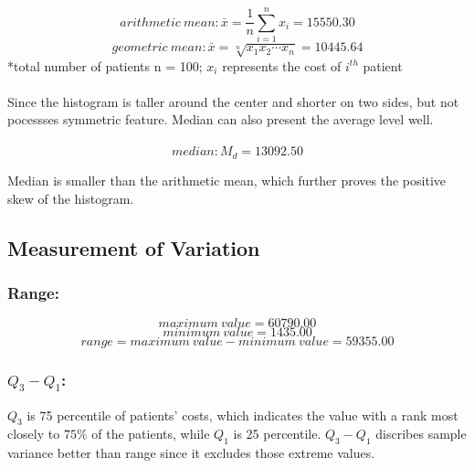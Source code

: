 \documentclass[11pt,a4paper,onside,UTF8]{article}
\begin{document}
\begin{equation}
	arithmetic \ mean: \bar{x} = \frac{1}{n}\sum_{i = 1}^{n} x_i = 15550.30
\end{equation}
\begin{equation}
	geometric \ mean: \bar{x}= \sqrt[n]{x_1 x_2 \cdots x_n} = 10445.64
\end{equation}
\small{*total number of patients n = 100; $x_i$ represents the cost of $i^{th}$ patient}
\\ \hspace*{\fill} \\

Since the histogram is taller around the center and shorter on two sides, but not pocessses symmetric feature. 
Median can also present the average level well. 
\\ \hspace*{\fill} \\

\begin{equation}
	median: M_d = 13092.50
\end{equation}

Median is smaller than the arithmetic mean, which further proves the positive skew of the histogram.

\subsection{Measurement of Variation}

\subsubsection*{Range:}
\begin{equation}
	maximum\ value = 60790.00
\end{equation}
\begin{equation}
	minimum\ value = 1435.00
\end{equation}
\begin{equation}
	range = maximum\ value - minimum\ value = 59355.00
\end{equation}

\subsubsection*{$Q_3-Q_1$:}

$Q_3$ is 75 percentile of patients' costs, which indicates the value with a rank most closely to $75\%$ of the patients, 
while $Q_1$ is 25 percentile.
$Q_3-Q_1$ discribes sample variance better than range since it excludes those extreme values.
\end{document}
